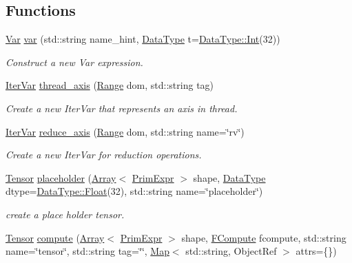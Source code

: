 \subsection*{Functions}
\begin{DoxyCompactItemize}
\item 
\hyperlink{classtvm_1_1tir_1_1Var}{Var} \hyperlink{namespacetvm_1_1te_ae0c71f84710b436cbe0b32289d0838f4}{var} (std\+::string name\+\_\+hint, \hyperlink{namespacetvm_a41918af1a1dc386388639a9d3ad06c5d}{Data\+Type} t=\hyperlink{classtvm_1_1runtime_1_1DataType_ab45f13dd70d982d9f977c79b6f7fac98}{Data\+Type\+::\+Int}(32))
\begin{DoxyCompactList}\small\item\em Construct a new Var expression. \end{DoxyCompactList}\item 
\hyperlink{classtvm_1_1tir_1_1IterVar}{Iter\+Var} \hyperlink{namespacetvm_1_1te_aacca360b75a7db1eb79785bff8c6e205}{thread\+\_\+axis} (\hyperlink{classtvm_1_1Range}{Range} dom, std\+::string tag)
\begin{DoxyCompactList}\small\item\em Create a new Iter\+Var that represents an axis in thread. \end{DoxyCompactList}\item 
\hyperlink{classtvm_1_1tir_1_1IterVar}{Iter\+Var} \hyperlink{namespacetvm_1_1te_aae384e9b73c2271905486e4a74b69265}{reduce\+\_\+axis} (\hyperlink{classtvm_1_1Range}{Range} dom, std\+::string name=\char`\"{}rv\char`\"{})
\begin{DoxyCompactList}\small\item\em Create a new Iter\+Var for reduction operations. \end{DoxyCompactList}\item 
\hyperlink{classtvm_1_1te_1_1Tensor}{Tensor} \hyperlink{namespacetvm_1_1te_a15a1cc6f7146730ec1f03210c81a8a3c}{placeholder} (\hyperlink{classtvm_1_1Array}{Array}$<$ \hyperlink{classtvm_1_1PrimExpr}{Prim\+Expr} $>$ shape, \hyperlink{namespacetvm_a41918af1a1dc386388639a9d3ad06c5d}{Data\+Type} dtype=\hyperlink{classtvm_1_1runtime_1_1DataType_a237a714a6a16e14aa01fa4ac52426551}{Data\+Type\+::\+Float}(32), std\+::string name=\char`\"{}placeholder\char`\"{})
\begin{DoxyCompactList}\small\item\em create a place holder tensor. \end{DoxyCompactList}\item 
\hyperlink{classtvm_1_1te_1_1Tensor}{Tensor} \hyperlink{namespacetvm_1_1te_aeacae1afc9dd1267cbb5779f9daa4671}{compute} (\hyperlink{classtvm_1_1Array}{Array}$<$ \hyperlink{classtvm_1_1PrimExpr}{Prim\+Expr} $>$ shape, \hyperlink{namespacetvm_1_1te_a234ec7f58c22878752d476bd7e99bcea}{F\+Compute} fcompute, std\+::string name=\char`\"{}tensor\char`\"{}, std\+::string tag=\char`\"{}\char`\"{}, \hyperlink{classtvm_1_1Map}{Map}$<$ std\+::string, Object\+Ref $>$ attrs=\{\})

\end{DoxyCompactItemize}
